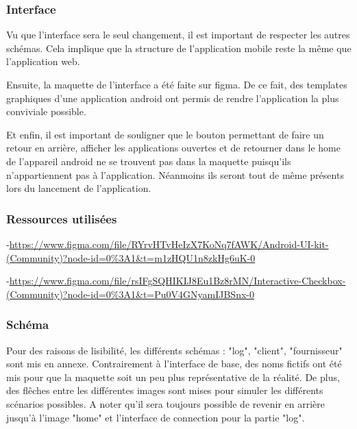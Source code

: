 \subsubsection{Interface}
\begin{flushleft}
Vu que l'interface sera le seul changement, il est important de respecter les autres schémas. Cela implique que la structure de l'application mobile reste la même que l'application web.
\end{flushleft}
\begin{flushleft}
Ensuite, la maquette de l'interface a été faite sur figma. De ce fait, des templates graphiques d'une application android ont permis de rendre l'application la plus conviviale possible.
\end{flushleft}
\begin{flushleft}
Et enfin, il est important de souligner que le bouton permettant de faire un retour en arrière, afficher les applications ouvertes et de retourner dans le home de l'appareil android ne se trouvent pas dans la maquette puisqu'ils n'appartiennent pas à l'application. Néanmoins ils seront tout de même présents lors du lancement de l'application.
\end{flushleft}
\newpage
\subsubsection{Ressources utilisées}
\begin{flushleft}
-\url{https://www.figma.com/file/RYrvHTvHeIzX7KoNq7fAWK/Android-UI-kit-(Community)?node-id=0\%3A1&t=m1zHQU1n8zkHg6uK-0}
\end{flushleft}
\begin{flushleft}
-\url{https://www.figma.com/file/rsIFgSQHIKIJ8Eu1Bz8rMN/Interactive-Checkbox-(Community)?node-id=0\%3A1&t=Pu0V4GNyamIJBSnx-0}
\end{flushleft}
\subsubsection{Schéma}
\begin{flushleft}
Pour des raisons de lisibilité, les différents schémas : "log", "client", "fournisseur" sont mis en annexe. Contrairement à l'interface de base, des noms fictifs ont été mis pour que la maquette soit un peu plus représentative de la réalité. De plus, des flêches entre les différentes images sont mises pour simuler les différents scénarios possibles. A noter qu'il sera toujours possible de revenir en arrière jusqu'à l'image "home" et l'interface de connection pour la partie "log".
\end{flushleft}
